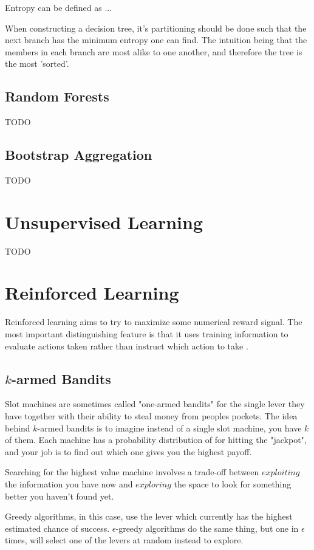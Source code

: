 Entropy can be defined as ...


When constructing a decision tree, it's partitioning should be done such that the next branch has the minimum entropy one can find. The intuition being that the members in each branch are most alike to one another, and therefore the tree is the most 'sorted'.

\subsection{Random Forests}
TODO
\subsection{Bootstrap Aggregation}
TODO


\section{Unsupervised Learning}
TODO
\section{Reinforced Learning}
Reinforced learning aims to try to maximize some numerical reward signal. The most important distinguishing feature is that it uses training information to evaluate actions taken rather than instruct which action to take \cite{sutton}.


\subsection{$k$-armed Bandits}
Slot machines are sometimes called "one-armed bandits" for the single lever they have together with their ability to steal money from peoples pockets. The idea behind $k$-armed bandits is to imagine instead of a single slot machine, you have $k$ of them. Each machine has a probability distribution of for hitting the "jackpot", and your job is to find out which one gives you the highest payoff.

Searching for the highest value machine involves a trade-off between $exploiting$ the information you have now and $exploring$ the space to look for something better you haven't found yet.

Greedy algorithms, in this case, use the lever which currently has the highest estimated chance of success. $\epsilon$-greedy algorithms do the same thing, but one in $\epsilon$ times, will select one of the levers at random instead to explore.


